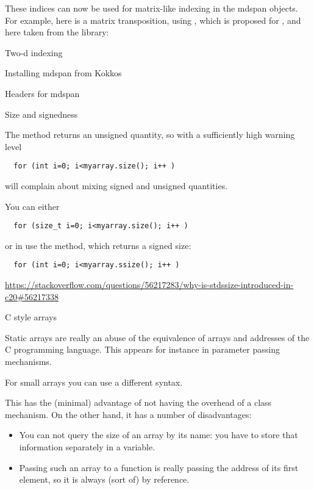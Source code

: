 These indices can now be used for matrix-like indexing in the mdspan objects.
For example, here is a matrix transposition,
using , which is proposed for ,
and here taken from the  library:

\begin{block}{Two-d indexing}
\end{block}


 {Installing mdspan from Kokkos}

\begin{block}{Headers for mdspan}
\end{block}

 {Size and signedness}

The  method returns an unsigned quantity,
so with a sufficiently high warning level
\begin{lstlisting}
  for (int i=0; i<myarray.size(); i++ )
\end{lstlisting}
will complain about mixing signed and unsigned quantities.

You can either
\begin{lstlisting}
  for (size_t i=0; i<myarray.size(); i++ )
\end{lstlisting}
or in  use the  method,
which returns a signed size:
\begin{lstlisting}
  for (int i=0; i<myarray.ssize(); i++ )
\end{lstlisting}

\url{https://stackoverflow.com/questions/56217283/why-is-stdssize-introduced-in-c20#56217338}

 {C style arrays}
\label{sec:staticarray}

Static arrays are really an abuse of the equivalence of arrays and
addresses of the C programming language. This appears for instance in
parameter passing mechanisms.

For small arrays you can use a different syntax. 


This has the
(minimal) advantage of not having the overhead of a class
mechanism. On the other hand, it has a number of disadvantages:
\begin{itemize}
\item You can not query the size of an array by its name: you have to
  store that information separately in a variable.
\item Passing such an array to a function is really passing the
  address of its first element, so it is always (sort of) by
  reference.
\end{itemize}

